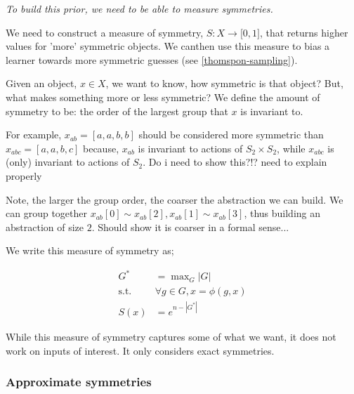 \begin{displayquote}
	\textsl{To build this prior, we need to be able to measure symmetries.}
\end{displayquote}

We need to construct a measure of symmetry, $S: X \to \mathbb [0, 1]$, that returns higher values for 'more' symmetric objects.
We canthen use this measure to bias a learner towards more symmetric guesses (see \ref{thomspon-sampling}).

Given an object, $x \in X$, we want to know, how symmetric is that object?
But, what makes something more or less symmetric?
We define the amount of symmetry to be: the order of the largest group that $x$ is invariant to.

For example, $x_{ab} = [a,a,b,b]$ should be considered more symmetric than $x_{abc} = [a,a,b,c]$ because,
$x_{ab}$ is invariant to actions of $S_2 \times S_2$, while $x_{abc}$ is (only) invariant to actions of $S_2$.
{\color{red}Do i need to show this?!? need to explain properly}

Note, the larger the group order, the coarser the abstraction we can build. We can group together $x_{ab}[0] \sim x_{ab}[2], x_{ab}[1] \sim x_{ab}[3]$, thus building an abstraction of size $2$.
{\color{red}Should show it is coarser in a formal sense...}


We write this measure of symmetry as;

\begin{align*}
G^{* } &= \mathop{\text{max}}_G |G| \tag{pick the largest group}\\
\text{s.t.} \;\; &\forall g\in G, x = \phi(g, x) \tag{that $x$ is invariant to} \\
S(x) &= e^{n-|G^{* }|}
\end{align*}

While this measure of symmetry captures some of what we want, it does not work on inputs of interest.
It only considers exact symmetries.

\subsubsection{Approximate symmetries}


